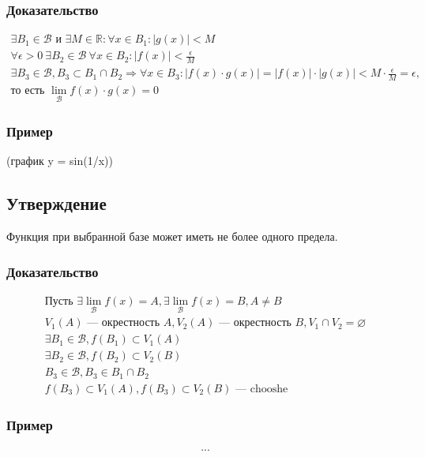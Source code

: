 \documentclass{article}
\begin{document}
\subsubsection{Доказательство}
\begin{gather*}
    \exists B_1 \in \mathcal{B} \text{ и } \exists M \in \mathbb{R}: \forall x \in B_1: |g(x)| < M \\
    \forall \epsilon > 0~\exists B_2 \in \mathcal{B}~\forall x \in B_2: |f(x)| < \frac{\epsilon}{M} \\
    \exists B_3 \in \mathcal{B}, B_3 \subset B_1 \cap B_2 \Rightarrow \forall x \in B_3: |f(x) \cdot g(x)| = |f(x)| \cdot |g(x)| < M \cdot \frac{\epsilon}{M} = \epsilon, \\
    \text{то есть } \lim_{\mathcal{B}} f(x) \cdot g(x) = 0
\end{gather*}

\subsubsection{Пример}
(график y = sin(1/x))


\subsection{Утверждение}
Функция при выбранной базе может иметь не более одного предела.

\subsubsection{Доказательство}
\begin{gather*}
    \text{Пусть } \exists \lim_{\mathcal{B}} f(x) = A, \exists \lim_{\mathcal{B}} f(x) = B, A \neq B \\
    V_1(A) \text{ --- окрестность } A, V_2(A) \text{ --- окрестность } B, V_1 \cap V_2 = \varnothing \\
    \exists B_1 \in \mathcal{B}, f(B_1) \subset V_1(A) \\
    \exists B_2 \in \mathcal{B}, f(B_2) \subset V_2(B) \\
    B_3 \in \mathcal{B}, B_3 \in B_1 \cap B_2 \\
    f(B_3) \subset V_1(A), f(B_3) \subset V_2(B) \text{ --- chooshe}
\end{gather*}


\subsubsection{Пример}
\begin{gather*}
    ...    
\end{gather*}
\end{document}
